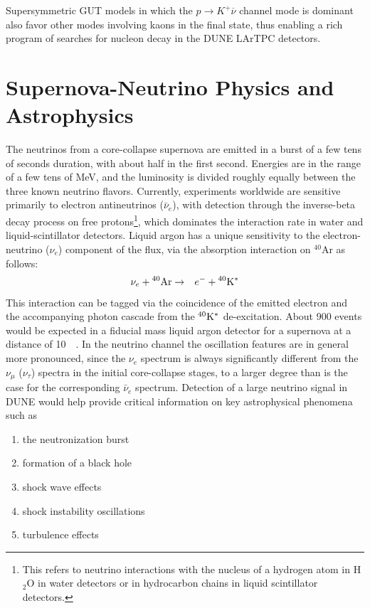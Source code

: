 Supersymmetric GUT models in which
the $p\to K^+\overline{\nu}$ channel mode is dominant also favor
other modes involving kaons in the final state, thus enabling a rich 
program of searches for nucleon decay in the DUNE LArTPC detectors.


\section{Supernova-Neutrino Physics and Astrophysics}

The neutrinos from a core-collapse supernova are emitted in a burst of
a few tens of seconds duration, with about half in the first
second. Energies are in the range of a few tens of MeV, and the
luminosity is divided roughly equally between the three known neutrino
flavors.  Currently, experiments worldwide are sensitive primarily to
electron antineutrinos ($\bar{\nu}_e$), with detection through the inverse-beta decay
process on free protons\footnote{This refers to neutrino interactions with the nucleus of a
hydrogen atom in H$_2$O in water detectors or in hydrocarbon chains in 
liquid scintillator detectors.},
 which dominates the interaction rate in water
and liquid-scintillator detectors.  Liquid argon has a unique sensitivity to
the electron-neutrino ($\nu_e$) component of the flux, via the absorption
interaction on $^{40}$Ar as follows:
\begin{eqnarray*}
\nu_e +{}^{40}{\rm Ar} & \rightarrow & e^-+{}^{40}{\rm K^*}
\end{eqnarray*} 
This interaction can be tagged via the coincidence of the emitted
electron and the accompanying photon cascade from the $^{40}{\rm K^*}$
de-excitation.  About 900 events would be expected in a 
fiducial mass liquid argon detector for a supernova at a distance of
\SI{10}{\kilo\parsec}.  In the neutrino channel the oscillation
features are in general more pronounced, since the $\nu_e$ spectrum is
always significantly different from the $\nu_\mu$ ($\nu_\tau$) spectra
in the initial core-collapse stages, to a larger degree than is the
case for the corresponding $\bar{\nu}_e$ spectrum.  Detection of a large
neutrino signal in DUNE would help provide critical information on key
astrophysical phenomena such as
\begin{enumerate}
\item the neutronization burst
\item formation of a black hole
\item shock wave effects
\item shock instability oscillations
\item turbulence effects
\end{enumerate}

